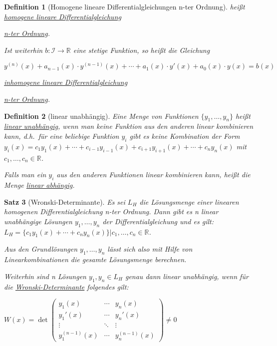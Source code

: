 \documentclass[fontset=ubuntu,11pt,a4paper,fleqn,headsepline]{scrreprt}
\newtheorem{defi}{Definition}[section]
\newtheorem{satz}[defi]{Satz}
\begin{document}
\begin{multicols}{2}
\begin{defi}[Homogene lineare Differentialgleichungen n-ter Ordnung]
            heißt \underline{homogene lineare Differentialgleichung} 
            
            \underline{n-ter Ordnung}.
    
            Ist weiterhin \(b:\mathcal{I}\to\mathbb{R}\) eine stetige Funktion, so heißt die Gleichung

            \(y^{(n)}(x) + a_{n-1}(x) \cdot y^{(n-1)}(x) + \cdots + a_1(x) \cdot y'(x) + a_0(x) \cdot y(x) = b(x) \)

            \underline{inhomogene lineare Differentialgleichung} 
            
            \underline{n-ter Ordnung}.
        \end{defi}
    
        \begin{defi}[linear unabhängig]
            Eine Menge von Funktionen \(\{y_1,\dots,y_n\}\) heißt \underline{linear unabhängig}, wenn man keine Funktion aus den anderen linear kombinieren kann, d.h.\ für eine beliebige Funktion \(y_i\) gibt es keine Kombination der Form \(y_i(x)=c_1y_1(x)+\cdots+c_{i-1}y_{i-1}(x)+c_{i+1}y_{i+1}(x)+\cdots+c_n y_n(x)\) mit \(c_1,\dots,c_n \in \mathbb{R}\).
    
            Falls man ein \(y_i\) aus den anderen Funktionen linear kombinieren kann, heißt die Menge \underline{linear abhängig}.
        \end{defi}
    
        \begin{satz}[Wronski-Determinante]
            Es sei \(L_H\) die Lösungsmenge einer linearen homogenen Differentialgleichung n-ter Ordnung. Dann gibt es n linear unabhängige Lösungen \(y_1,\dots,y_n\) der Differentialgleichung und es gilt: \(L_H=\{c_1y_1(x)+\cdots+c_n y_n(x)\}|c_1,\dots,c_n\in\mathbb{R}\).
    
            Aus den Grundlösungen \(y_1,\dots,y_n\) lässt sich also mit Hilfe von Linearkombinationen die gesamte Lösungsmenge berechnen.
    
            Weiterhin sind n Lösungen \(y_1,y_n \in L_H\) genau dann linear unabhängig, wenn für die \underline{Wronski-Determinante} folgendes gilt:

            \(W(x)=\det\begin{pmatrix}
                y_1(x) & \cdots & y_n(x) \\
                y_1'(x) & \cdots & y_n'(x) \\
                \vdots & \ddots & \vdots \\
                y_1^{(n-1)}(x) & \cdots & y_n^{(n-1)}(x)
            \end{pmatrix} \ne 0 \)


\end{satz}
\end{multicols}
\end{document}
